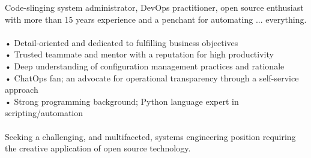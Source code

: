 \begin{cvparagraph}
Code-slinging system administrator, DevOps practitioner, open source enthusiast \\
with more than 15 years experience and a penchant for automating ... everything. \\
\\
• Detail-oriented and dedicated to fulfilling business objectives \\
• Trusted teammate and mentor with a reputation for high productivity \\
• Deep understanding of configuration management practices and rationale \\
• ChatOps fan; an advocate for operational transparency through a self-service approach \\
• Strong programming background; Python language expert in scripting/automation \\
\\
Seeking a challenging, and multifaceted, systems engineering position requiring the creative application of open source technology.
\end{cvparagraph}

